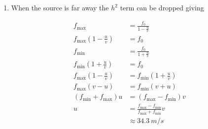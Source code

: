 \documentclass{article}
\begin{document}
\begin{enumerate}
  \item

        When the source is far away the $h^2$ term can be dropped giving

        \begin{align*}
          f_\text{max}                                & = \frac{f_0}{1 - \frac{u}{v}}                                       \\
          f_\text{max} \left( 1 - \frac{u}{v} \right) & = f_0                                                               \\
          f_\text{min}                                & = \frac{f_0}{1 + \frac{u}{v}}                                       \\
          f_\text{min} \left( 1 + \frac{u}{v} \right) & = f_0                                                               \\
          f_\text{max} \left( 1 - \frac{u}{v} \right) & = f_\text{min} \left( 1 + \frac{u}{v} \right)                       \\
          f_\text{max} (v - u)                        & = f_\text{min} (v + u)                                              \\
          (f_\text{min} + f_\text{max}) u             & = (f_\text{max} - f_\text{min}) v                                   \\
          u                                           & = \frac{f_\text{max} - f_\text{min}}{f_\text{max} + f_\text{min}} v \\
                                                      & \approx \qty{34.3}{m/s}
        \end{align*}


\end{enumerate}
\end{document}
